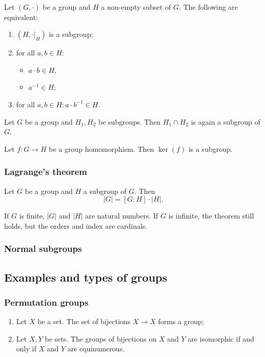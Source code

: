 \begin{lemma}
Let $(G,\boldsymbol{\cdot})$ be a group and $H$ a non-empty subset of $G$. The following are equivalent:
\begin{enumerate}
\item $(H,\boldsymbol{\cdot}|_H)$ is a subgroup;
\item for all $a,b\in H$:
\begin{itemize}
\item $a\cdot b \in H$,
\item $a^{-1}\in H$;
\end{itemize}
\item for all $a,b\in H: a\cdot b^{-1} \in H$.
\end{enumerate}
\end{lemma}

\begin{lemma}
Let $G$ be a group and $H_1, H_2$ be subgroups. Then $H_1\cap H_2$ is again a subgroup of $G$.
\end{lemma}
\begin{lemma}
Let $f:G\to H$ be a group homomorphism. Then $\ker(f)$ is a subgroup.
\end{lemma}

\subsubsection{Lagrange's theorem}
\begin{theorem}
Let $G$ be a group and $H$ a subgroup of $G$. Then
\[ |G| = [G:H]\cdot |H|. \]
\end{theorem}
If $G$ is finite, $|G|$ and $|H|$ are natural numbers. If $G$ is infinite, the theorem still holds, but the orders and index are cardinals.

\subsubsection{Normal subgroups}



\subsection{Examples and types of groups}
\subsubsection{Permutation groups}
\begin{proposition}
\begin{enumerate}
\item Let $X$ be a set. The set of bijections $X\to X$ forms a group;
\item Let $X,Y$ be sets. The groups of bijections on $X$ and $Y$ are isomorphic \textup{if and only if} $X$ and $Y$ are equinumerous.
\end{enumerate}
\end{proposition}

